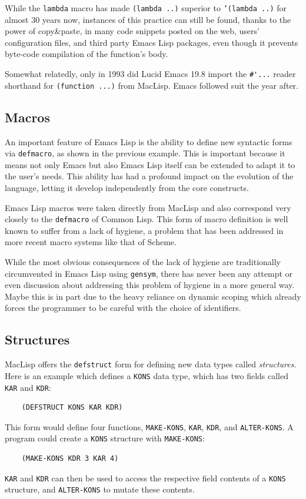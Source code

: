 \documentclass[format=acmsmall,screen]{acmart}
\newcommand \Elisp {Emacs Lisp}
\begin{document}
While the \texttt{lambda} macro has made \texttt{(lambda ..)} superior to
\texttt{'(lambda ..)} for almost
30 years now, instances of this practice can still be found, thanks to the
power of copy\&paste, in many code snippets posted on the web, users'
configuration files, and third party \Elisp{} packages, even though it
prevents byte-code compilation of the function's body.

Somewhat relatedly, only in 1993 did Lucid Emacs 19.8 import the
\verb|#'...| reader shorthand for \texttt{(function ...)} from MacLisp.
Emacs followed suit the year after.

\subsection{Macros}
\label{sec:macros}

An important feature of \Elisp{} is the ability to define new syntactic
forms via \texttt{defmacro}, as shown in the previous example.  This is
important because it means not only Emacs but also \Elisp{} itself can be
extended to adapt it to the user's needs.  This ability has had a profound
impact on the evolution of the language, letting it develop independently
from the core constructs.

\Elisp{} macros were taken directly from MacLisp and also correspond very
closely to the \texttt{defmacro} of Common Lisp.  This form of macro
definition is well known to suffer from a lack of hygiene, a problem that
has been addressed in more recent macro systems like that of Scheme.

While the most obvious consequences of the lack of hygiene are traditionally
circumvented in \Elisp{} using \texttt{gensym}, there has never been any
attempt or even discussion about addressing this problem of hygiene in
a more general way.  Maybe this is in part due to the heavy reliance on
dynamic scoping which already forces the programmer to be careful with the
choice of identifiers.

\subsection{Structures}
\label{sec:structures}

MacLisp offers the \texttt{defstruct} form for defining new data
types called \textit{structures}.  Here is an example which defines a
\texttt{KONS} data type, which has two fields called \texttt{KAR} and \texttt{KDR}:
%
\begin{verbatim}
    (DEFSTRUCT KONS KAR KDR)
\end{verbatim}
%
This form would define four functions, \texttt{MAKE-KONS}, \texttt{KAR},
\texttt{KDR}, and \texttt{ALTER-KONS}.  A program could create a
\texttt{KONS} structure with \texttt{MAKE-KONS}:
%
\begin{verbatim}
    (MAKE-KONS KDR 3 KAR 4)
\end{verbatim}
%
\texttt{KAR} and \texttt{KDR} can then be used to access the
respective field contents of a \texttt{KONS} structure, and
\texttt{ALTER-KONS} to mutate these contents.
\end{document}
